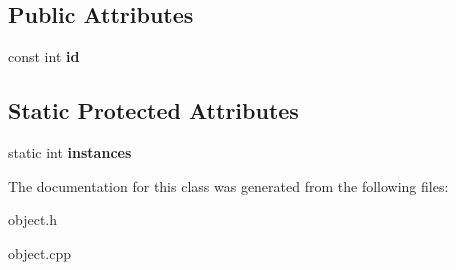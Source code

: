\subsection*{Public Attributes}
\begin{DoxyCompactItemize}
\item 
\hypertarget{classda__game_1_1Object_ab2a154b5ce3c8e9acb7e60614687d704}{
const int {\bfseries id}}
\label{classda__game_1_1Object_ab2a154b5ce3c8e9acb7e60614687d704}

\end{DoxyCompactItemize}
\subsection*{Static Protected Attributes}
\begin{DoxyCompactItemize}
\item 
\hypertarget{classda__game_1_1Object_a696eccdeb3f9d1df936ee93aeb1da16f}{
static int {\bfseries instances}}
\label{classda__game_1_1Object_a696eccdeb3f9d1df936ee93aeb1da16f}

\end{DoxyCompactItemize}


The documentation for this class was generated from the following files:\begin{DoxyCompactItemize}
\item 
object.h\item 
object.cpp\end{DoxyCompactItemize}
